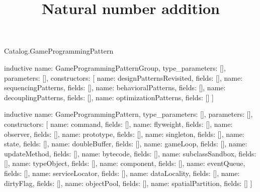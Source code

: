 \begin{lexlean}{Catalog.GameProgrammingPattern}
\title{Natural number addition}
\begin{semanticmodule}
inductive{
  name: GameProgrammingPatternGroup,
  type_parameters: [],
  parameters: [],
  constructors: [
    {name: designPatternsRevisited, fields: []},
    {name: sequencingPatterns, fields: []},
    {name: behavioralPatterns, fields: []},
    {name: decouplingPatterns, fields: []},
    {name: optimizationPatterns, fields: []}
  ]
}

inductive{
  name: GameProgrammingPattern,
  type_parameters: [],
  parameters: [],
  constructors: [
    {name: command, fields: []},
    {name: flyweight, fields: []},
    {name: observer, fields: []},
    {name: prototype, fields: []},
    {name: singleton, fields: []},
    {name: state, fields: []},
    {name: doubleBuffer, fields: []},
    {name: gameLoop, fields: []},
    {name: updateMethod, fields: []},
    {name: bytecode, fields: []},
    {name: subclassSandbox, fields: []},
    {name: typeObject, fields: []},
    {name: component, fields: []},
    {name: eventQueue, fields: []},
    {name: serviceLocator, fields: []},
    {name: dataLocality, fields: []},
    {name: dirtyFlag, fields: []},
    {name: objectPool, fields: []},
    {name: spatialPartition, fields: []}
  ]
}
\end{semanticmodule}
\end{lexlean}
